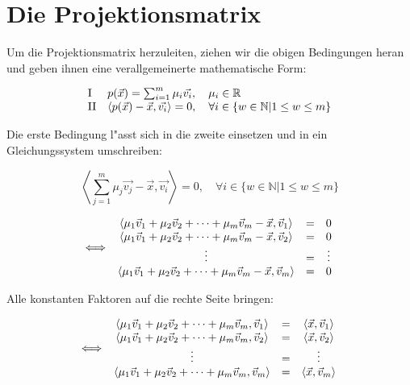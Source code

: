 \documentclass{article}
\newcommand{\rz}[1]{\ensuremath{\mathord{\mathrm{#1}}}}
\newcommand{\lrangle}[1]{\left\langle #1 \right\rangle}
\begin{document}
\section{Die Projektionsmatrix}
Um die Projektionsmatrix herzuleiten, ziehen wir die obigen Bedingungen heran
und geben ihnen eine verallgemeinerte mathematische Form:

    \begin{equation}
        \begin{array}{l l}
            \rz{I}  &
            p(\vec{x}) = \sum_{i=1}^{m}{\mu _i\vec{v_i}}, \quad \mu _i \in
              \mathbb{R} \\ \rz{II} &
            \lrangle{ p(\vec{x}) - \vec{x}, \vec{v_i} } = 0, \quad \forall i \in
              \{ w \in \mathbb{N} | 1 \leq w \leq m \}
        \end{array}
    \end{equation}

Die erste Bedingung l"asst sich in die zweite einsetzen und in ein
Gleichungssystem umschreiben:

    \begin{equation}
        \lrangle{ \sum_{j=1}^{m}{\mu _j\vec{v_j}} - \vec{x}, \vec{v_i} } = 0,
          \quad \forall i \in \{ w \in \mathbb{N} | 1 \leq w \leq m \}
    \end{equation}

    \begin{equation}
        \iff
        \begin{array}{c c c}
            \lrangle{ \mu _1 \vec{v}_1 + \mu _2 \vec{v}_2 + \cdots + \mu _m
              \vec{v}_m - \vec{x}, \vec{v}_1 } &
            = &
            0 \\
            \lrangle{ \mu _1 \vec{v}_1 + \mu _2 \vec{v}_2 + \cdots + \mu _m
              \vec{v}_m - \vec{x},
              \vec{v}_2 } &
            = &
            0 \\
            \vdots &
            = &
            \vdots \\
            \lrangle{ \mu _1 \vec{v}_1 + \mu _2 \vec{v}_2 + \cdots + \mu _m
              \vec{v}_m - \vec{x}, \vec{v}_m } &
            = &
            0
        \end{array}
    \end{equation}

Alle konstanten Faktoren auf die rechte Seite bringen:

    \begin{equation}
        \iff
        \begin{array}{c c c}
            \lrangle{ \mu _1 \vec{v}_1 + \mu _2 \vec{v}_2 + \cdots + \mu _m
              \vec{v}_m, \vec{v}_1 } & = & \lrangle{ \vec{x}, \vec{v}_1 } \\
            \lrangle{ \mu _1 \vec{v}_1 + \mu _2 \vec{v}_2 + \cdots + \mu _m
              \vec{v}_m, \vec{v}_2 } & = & \lrangle{ \vec{x}, \vec{v}_2 } \\
            \vdots & = & \vdots \\
            \lrangle{ \mu _1 \vec{v}_1 + \mu _2 \vec{v}_2 + \cdots + \mu _m
              \vec{v}_m, \vec{v}_m } & = & \lrangle{ \vec{x}, \vec{v}_m }
        \end{array}
    \end{equation}
\end{document}
